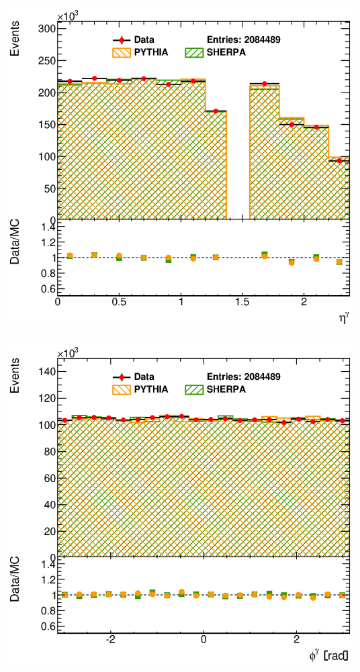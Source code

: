 \documentclass[12pt, twoside]{article}
\numberwithin{equation}{section}
\numberwithin{figure}{section}
\newenvironment{changemargin}[2]{%
\begin{list}{}{%
\setlength{\topsep}{0pt}%
\setlength{\leftmargin}{#1}%
\setlength{\rightmargin}{#2}%
\setlength{\listparindent}{\parindent}%
\setlength{\itemindent}{\parindent}%
\setlength{\parsep}{\parskip}%
}%
\item[]}{\end{list}}
\begin{document}
\begin{figure}
\begin{changemargin}{-1.0cm}{-0.75cm}
\begin{changemargin}{-0.75cm}{-1.0cm}
\begin{subfigure}[b]{0.37\textwidth}
            \includegraphics[width=\textwidth]{./images/Results(MUReweight)/DEF-102.eps}
            \subcaption{}
            \label{fig:MUReweightEtaPhoton}
        \end{subfigure}
        \begin{subfigure}[b]{0.37\textwidth}
            \includegraphics[width=\textwidth]{./images/Results(MUReweight)/DEF-103.eps}
            \subcaption{}
            \label{fig:MUReweightPhiPhoton}
        \end{subfigure}


\end{changemargin}
\end{changemargin}
\end{figure}
\end{document}
